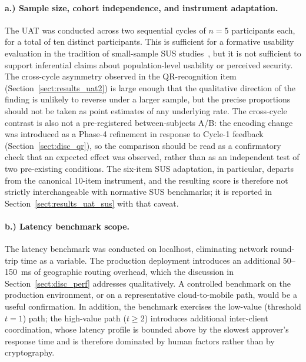 \paragraph{a.) Sample size, cohort independence, and instrument adaptation.}
The UAT was conducted across two sequential cycles of $n = 5$ participants each, for a total of ten distinct participants. This is sufficient for a formative usability evaluation in the tradition of small-sample SUS studies~\cite{brooke1996sus, bangor2008sus}, but it is not sufficient to support inferential claims about population-level usability or perceived security. The cross-cycle asymmetry observed in the QR-recognition item (Section~\ref{sect:results_uat2}) is large enough that the qualitative direction of the finding is unlikely to reverse under a larger sample, but the precise proportions should not be taken as point estimates of any underlying rate. The cross-cycle contrast is also not a pre-registered between-subjects A/B: the encoding change was introduced as a Phase-4 refinement in response to Cycle-1 feedback (Section~\ref{sect:disc_qr}), so the comparison should be read as a confirmatory check that an expected effect was observed, rather than as an independent test of two pre-existing conditions. The six-item SUS adaptation, in particular, departs from the canonical 10-item instrument, and the resulting score is therefore not strictly interchangeable with normative SUS benchmarks; it is reported in Section~\ref{sect:results_uat_sus} with that caveat.

\paragraph{b.) Latency benchmark scope.}
The latency benchmark was conducted on localhost, eliminating network round-trip time as a variable. The production deployment introduces an additional 50--150~ms of geographic routing overhead, which the discussion in Section~\ref{sect:disc_perf} addresses qualitatively. A controlled benchmark on the production environment, or on a representative cloud-to-mobile path, would be a useful confirmation. In addition, the benchmark exercises the low-value (threshold $t = 1$) path; the high-value path ($t \geq 2$) introduces additional inter-client coordination, whose latency profile is bounded above by the slowest approver's response time and is therefore dominated by human factors rather than by cryptography.

